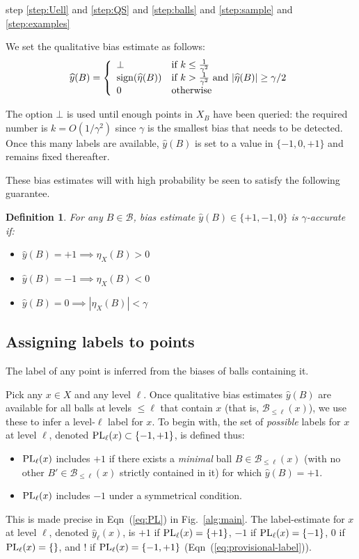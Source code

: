 \documentclass[twoside]{article}
\def\B{{\mathcal B}}
\def\yh{{\widehat{y}}}
\def\sign{{\rm sign}}
\def\PL{{\mbox{\rm PL}}}
\newtheorem{defn}[thm]{Definition}
\begin{document}
step \ref{step:Uell} and \ref{step:QS} and \ref{step:balls} and \ref{step:sample} and \ref{step:examples}

We set the qualitative bias estimate as follows:
$$ \yh(B)
= 
\left\{
  \begin{array}{ll}
    \bot & \mbox{if $k \leq \frac{1}{\gamma^2}$} \\
\sign(\widehat{\eta}(B)) & \mbox{if  $k > \frac{1}{\gamma^2}$ and $|\widehat{\eta}(B)| \geq \gamma/2$} \\
0 & \mbox{otherwise}
\end{array}
\right.
$$

The option $\bot$ is used until enough points in $X_B$ have been queried: the required number is $k = O(1/\gamma^2)$ since $\gamma$ is the smallest bias that needs to be detected. Once this many labels are available, $\yh(B)$ is set to a value in $\{-1,0,+1\}$ and remains fixed thereafter.

These bias estimates will with high probability be seen to satisfy the following guarantee.
\begin{defn}
For any $B \in \B$, bias estimate $\yh(B) \in \{+1,-1,0\}$ is \emph{$\gamma$-accurate} if:
\begin{itemize}
\item $\yh(B) = +1 \implies \eta_X(B) > 0$
\item $\yh(B) = -1 \implies \eta_X(B) < 0$
\item $\yh(B) = 0 \implies |\eta_X(B)| < \gamma$
\end{itemize}
\label{def:accurate-bias-estimate}
\end{defn}

\subsection{Assigning labels to points}

The label of any point is inferred from the biases of balls containing it. 

Pick any $x \in X$ and any level $\ell$. Once qualitative bias estimates $\yh(B)$ are available for all balls at levels $\leq \ell$ that contain $x$ (that is, $\B_{\leq \ell}(x)$), we use these to infer a level-$\ell$ label for $x$. To begin with, the set of \emph{possible} labels for $x$ at level $\ell$, denoted $\PL_\ell(x) \subset \{-1,+1\}$, is defined thus:
\begin{itemize}[leftmargin=0.5cm]
\item $\PL_\ell(x)$ includes $+1$ if there exists a \emph{minimal} ball $B \in \B_{\leq \ell}(x)$ (with no other $B' \in \B_{\leq \ell}(x)$ strictly contained in it) for which $\yh(B) = +1$.
\item $\PL_\ell(x)$ includes $-1$ under a symmetrical condition.
\end{itemize}
This is made precise in Eqn~(\ref{eq:PL}) in Fig.~\ref{alg:main}. The label-estimate for $x$ at level $\ell$, denoted $\yh_\ell(x)$, is $+1$ if $\PL_\ell(x)=\{+1\}$, $-1$ if $\PL_\ell(x) = \{-1\}$, $0$ if $\PL_\ell(x) = \{\}$, and $!$ if $\PL_\ell(x) = \{-1,+1\}$ (Eqn~(\ref{eq:provisional-label})). 
\end{document}
